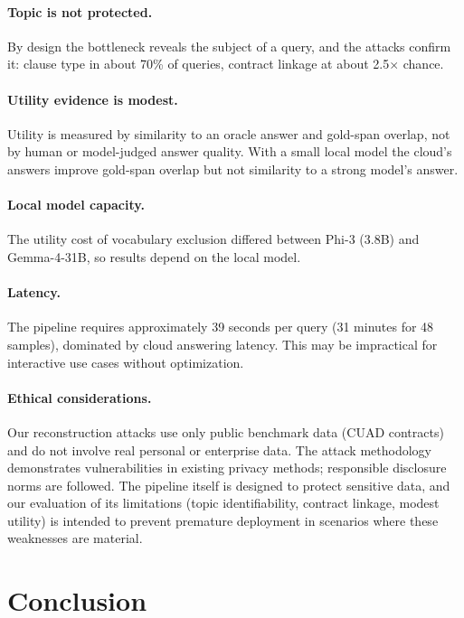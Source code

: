 \documentclass[sigconf,balance=false]{acmart}
\begin{document}
\paragraph{Topic is not protected.} By design the bottleneck reveals the subject of a query, and the attacks confirm it: clause type in about 70\% of queries, contract linkage at about 2.5$\times$ chance.

\paragraph{Utility evidence is modest.} Utility is measured by similarity to an oracle answer and gold-span overlap, not by human or model-judged answer quality. With a small local model the cloud's answers improve gold-span overlap but not similarity to a strong model's answer.

\paragraph{Local model capacity.} The utility cost of vocabulary exclusion differed between Phi-3 (3.8B) and Gemma-4-31B, so results depend on the local model.

\paragraph{Latency.} The pipeline requires approximately 39 seconds per query (31 minutes for 48 samples), dominated by cloud answering latency. This may be impractical for interactive use cases without optimization.

\paragraph{Ethical considerations.} Our reconstruction attacks use only public benchmark data (CUAD contracts) and do not involve real personal or enterprise data. The attack methodology demonstrates vulnerabilities in existing privacy methods; responsible disclosure norms are followed. The pipeline itself is designed to protect sensitive data, and our evaluation of its limitations (topic identifiability, contract linkage, modest utility) is intended to prevent premature deployment in scenarios where these weaknesses are material.

\section{Conclusion}
\label{sec:conclusion}
\end{document}
